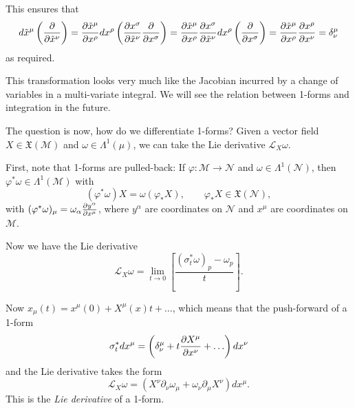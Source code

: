 This ensures that
\begin{equation}
  d\tilde x^\mu \left( \pdv{}{\tilde x^\nu} \right) = \pdv{\tilde x^\mu}{x^\rho} dx^\rho \left( \pdv{x^\sigma}{\tilde x^\nu} \pdv{}{x^\sigma} \right) = \pdv{\tilde x^\mu}{x^\rho} \pdv{x^\sigma}{\tilde x^\nu} dx^\rho \left( \pdv{}{x^\sigma} \right) = \pdv{\tilde x^\mu}{x^\rho} \pdv{x^\rho}{x^\nu} = \delta^\mu_\nu
\end{equation}
as required.
\begin{leftbar}
  \begin{remark}
    This transformation looks very much like the Jacobian incurred by a change of variables in a multi-variate integral. We will see the relation between 1-forms and integration in the future.
  \end{remark}
\end{leftbar}

The question is now, how do we differentiate 1-forms?
Given a vector field $X \in \mathfrak{X}(\mathcal{M})$ and $\omega \in \Lambda^1 (\mu)$, we can take the Lie derivative $\mathcal{L}_X \omega$. \par
First, note that 1-forms are pulled-back: If $\varphi: \mathcal{M} \to \mathcal{N}$ and $\omega \in \Lambda^1(\mathcal{N})$, then $\varphi^* \omega \in \Lambda^1(\mathcal{M})$ with
\begin{equation}
  (\varphi^* \omega) X = \omega (\varphi_* X), \qquad \varphi_* X \in \mathfrak{X}(\mathcal{N}),
\end{equation}
with $(\varphi^* \omega)_\mu = \omega_\alpha \pdv{y^\alpha}{x^\mu}$, where $y^\alpha$ are coordinates on $\mathcal{N}$ and $x^\mu$ are coordinates on $\mathcal{M}$.

Now we have the Lie derivative
\begin{equation}
  \mathcal{L}_X \omega = \lim_{t \to 0} \left[ \frac{(\sigma_t^* \omega)_p - \omega_p}{t} \right].
\end{equation}

Now $x_\mu(t) = x^\mu(0) + X^\mu(x) t + \ldots$, which means that the push-forward of a 1-form
\begin{equation}
  \sigma_t^* dx^\mu = \left( \delta^\mu_\nu + t \pdv{X^\mu}{x^\nu} + \ldots \right) dx^\nu
\end{equation}
and the Lie derivative takes the form
\begin{equation}
  \mathcal{L}_X \omega = (X^\nu \partial_\nu \omega_\mu + \omega_\nu \partial_\mu X^\nu) dx^\mu.
\end{equation}
This is the \emph{Lie derivative} of a 1-form.

